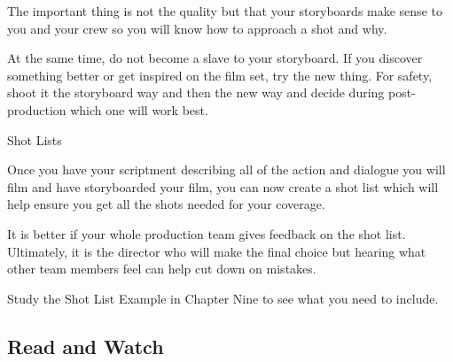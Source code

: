 \documentclass[
]{book}
\begin{document}
The important thing is not the quality but that your storyboards make sense to you and your crew so you will know how to approach a shot and why.

At the same time, do not become a slave to your storyboard. If you discover something better or get inspired on the film set, try the new thing. For safety, shoot it the storyboard way and then the new way and decide during post-production which one will work best.

{Shot Lists}

Once you have your scriptment describing all of the action and dialogue you will film and have storyboarded your film, you can now create a shot list which will help ensure you get all the shots needed for your coverage.

It is better if your whole production team gives feedback on the shot list. Ultimately, it is the director who will make the final choice but hearing what other team members feel can help cut down on mistakes.

Study the Shot List Example in Chapter Nine to see what you need to include.

\hypertarget{read-and-watch}{%
\subsection*{Read and Watch}\label{read-and-watch}}
\end{document}
